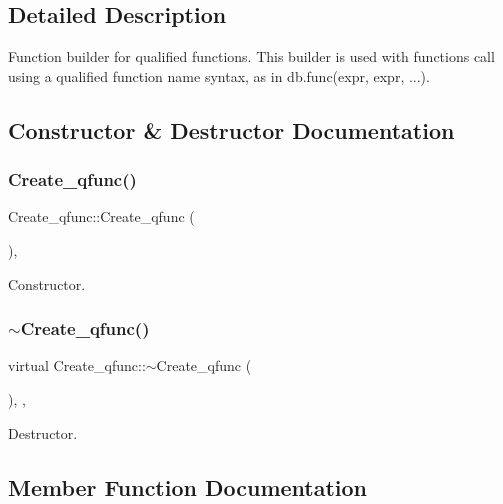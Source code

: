 \subsection{Detailed Description}
Function builder for qualified functions. This builder is used with functions call using a qualified function name syntax, as in {\ttfamily db.\+func(expr, expr, ...)}. 

\subsection{Constructor \& Destructor Documentation}
\mbox{\label{classCreate__qfunc_adccfcbb49b8ba1bbc05a1cfd4943681e}} 
\subsubsection{\texorpdfstring{Create\+\_\+qfunc()}{Create\_qfunc()}}
{\footnotesize\ttfamily Create\+\_\+qfunc\+::\+Create\+\_\+qfunc (\begin{DoxyParamCaption}{ }\end{DoxyParamCaption})\hspace{0.3cm}{\ttfamily [inline]}, {\ttfamily [protected]}}

Constructor. \mbox{\label{classCreate__qfunc_a26a42634953058108c887134bd90aa04}} 
\subsubsection{\texorpdfstring{$\sim$\+Create\+\_\+qfunc()}{~Create\_qfunc()}}
{\footnotesize\ttfamily virtual Create\+\_\+qfunc\+::$\sim$\+Create\+\_\+qfunc (\begin{DoxyParamCaption}{ }\end{DoxyParamCaption})\hspace{0.3cm}{\ttfamily [inline]}, {\ttfamily [protected]}, {\ttfamily [virtual]}}

Destructor. 

\subsection{Member Function Documentation}
\mbox{\label{classCreate__qfunc_a8d6874ea57598603b833b89e70c139d0}} 
